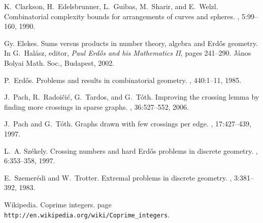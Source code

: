 \documentclass[11pt]{article}
\newcommand\erdos{{Erd{\H o}s}\xspace}
\newcommand\szemeredi{{Szemer\'edi}\xspace}
\begin{document}

\begin{thebibliography}{1}

K.~Clarkson, H.~Edelsbrunner, L.~Guibas, M.~Sharir, and E.~Welzl.
\newblock Combinatorial complexity bounds for arrangements of curves and
  spheres.
, 5:99--160, 1990.

Gy. Elekes.
\newblock Sums versus products in number theory, algebra and \erdos geometry.
\newblock In G.~Hal\'asz, editor, {\em Paul \erdos and his Mathematics II},
  pages 241--290. J\'anos Bolyai Math. Soc., Budapest, 2002.

P.~\erdos.
\newblock Problems and results in combinatorial geometry.
, 440:1--11, 1985.

J.~Pach, R.~Radoi\v{c}i\'c, G.~Tardos, and G.~T\'oth.
\newblock Improving the crossing lemma by finding more crossings in sparse
  graphs.
, 36:527--552, 2006.

J.~Pach and G.~T\'oth.
\newblock Graphs drawn with few crossings per edge.
, 17:427--439, 1997.

L.~A. Sz\'ekely.
\newblock Crossing numbers and hard \erdos problems in discrete geometry.
, 6:353--358, 1997.

E.~\szemeredi and W.~Trotter.
\newblock Extremal problems in discrete geometry.
, 3:381--392, 1983.

Wikipedia.
\newblock Coprime integers.
\newblock page \verb|http://en.wikipedia.org/wiki/Coprime_integers|.

\end{thebibliography}
\end{document}
